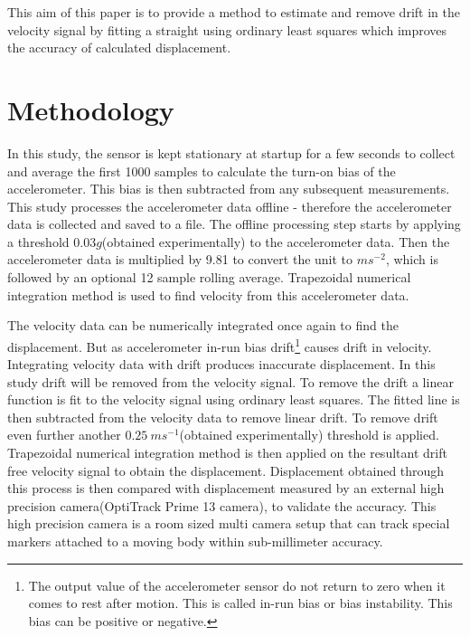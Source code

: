 \documentclass{article}
\begin{document}
This aim of this paper is to provide a method to estimate and remove drift in the velocity signal by fitting a straight using ordinary least squares which improves the accuracy of calculated displacement.

\section{Methodology}
In this study, the sensor is kept stationary at startup for a few seconds to collect and average the first 1000 samples to calculate the turn-on bias of the accelerometer. This bias is then subtracted from any subsequent measurements. This study processes the accelerometer data offline - therefore the accelerometer data is collected and saved to a file. The offline processing step starts by applying a threshold $0.03g$(obtained experimentally) to the accelerometer data. Then the accelerometer data is multiplied by 9.81 to convert the unit to $ms^{-2}$, which is followed by an optional 12 sample rolling average. Trapezoidal numerical integration method is used to find velocity from this accelerometer data. 

The velocity data can be numerically integrated once again to find the displacement. But as accelerometer in-run bias drift\footnote{The output value of the accelerometer sensor do not return to zero when it comes to rest after motion. This is called in-run bias or bias instability. This bias can be positive or negative.} causes drift in velocity. Integrating velocity data with drift produces inaccurate displacement. In this study drift will be removed from the velocity signal. To remove the drift a linear function is fit to the velocity signal using ordinary least squares. The fitted line is then subtracted from the velocity data to remove linear drift. To remove drift even further another $0.25\ ms^{-1}$(obtained experimentally) threshold is applied. Trapezoidal numerical integration method is then applied on the resultant drift free velocity signal to obtain the displacement. Displacement obtained through this process is then compared with displacement measured by an external high precision camera(OptiTrack Prime 13 camera), to validate the accuracy. This high precision camera is a room sized multi camera setup that can track special markers attached to a moving body within sub-millimeter accuracy.
\end{document}
